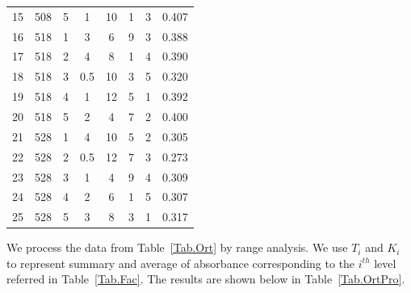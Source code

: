 \begin{table}[H]
\begin{tabular}{cccccccc}
	15    & 508           & 5 & 1                  & 10    & 1                  & 3 & 0.407     \\
	16    & 518           & 1 & 3                  & 6     & 9                  & 3 & 0.388     \\
	17    & 518           & 2 & 4                  & 8     & 1                  & 4 & 0.390     \\
	18    & 518           & 3 & 0.5                & 10    & 3                  & 5 & 0.320     \\
	19    & 518           & 4 & 1                  & 12    & 5                  & 1 & 0.392     \\
	20    & 518           & 5 & 2                  & 4     & 7                  & 2 & 0.400     \\
	21    & 528           & 1 & 4                  & 10    & 5                  & 2 & 0.305     \\
	22    & 528           & 2 & 0.5                & 12    & 7                  & 3 & 0.273     \\
	23    & 528           & 3 & 1                  & 4     & 9                  & 4 & 0.309     \\
	24    & 528           & 4 & 2                  & 6     & 1                  & 5 & 0.307     \\
	25    & 528           & 5 & 3                  & 8     & 3                  & 1 & 0.317     \\
	\bottomrule
	\end{tabular}
\end{table}

We process the data from Table~\ref{Tab.Ort} by range analysis. We use $T_i$ and $K_i$ to represent summary and average of absorbance corresponding to the $i^{th}$ level referred in Table~\ref{Tab.Fac}. The results are shown below in Table~\ref{Tab.OrtPro}.

